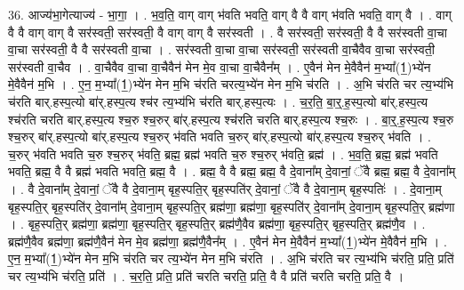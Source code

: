 \documentclass[17pt]{extarticle}
\begin{document}
36. आज्य॑भा॒गेत्याज्य॑ - भा॒गा॒ । . भ॒व॒ति॒ वाग् वाग् भ॑वति भवति॒ वाग् वै वै वाग् भ॑वति भवति॒ वाग् वै । . वाग् वै वै वाग् वाग् वै सर॑स्वती॒ सर॑स्वती॒ वै वाग् वाग् वै सर॑स्वती । . वै सर॑स्वती॒ सर॑स्वती॒ वै वै सर॑स्वती वा॒चा वा॒चा सर॑स्वती॒ वै वै सर॑स्वती वा॒चा । . सर॑स्वती वा॒चा वा॒चा सर॑स्वती॒ सर॑स्वती वा॒चैवैव वा॒चा सर॑स्वती॒ सर॑स्वती वा॒चैव । . वा॒चैवैव वा॒चा वा॒चैवैन॑ मेन मे॒व वा॒चा वा॒चैवैन᳚म् । . ए॒वैन॑ मेन मे॒वैवैन॑ म॒भ्या᳚(1॒)भ्ये॑न मे॒वैवैन॑ म॒भि । . ए॒न॒ म॒भ्या᳚(1॒)भ्ये॑न मेन म॒भि च॑रति चरत्य॒भ्ये॑न मेन म॒भि च॑रति । . अ॒भि च॑रति चर त्य॒भ्य॑भि च॑रति बार्.हस्प॒त्यो बा॑र्.हस्प॒त्य श्च॑र त्य॒भ्य॑भि च॑रति बार्.हस्प॒त्यः । . च॒र॒ति॒ बा॒र्॒.ह॒स्प॒त्यो बा॑र्.हस्प॒त्य श्च॑रति चरति बार्.हस्प॒त्य श्च॒रु श्च॒रुर् बा॑र्.हस्प॒त्य श्च॑रति चरति बार्.हस्प॒त्य श्च॒रुः । . बा॒र्॒.ह॒स्प॒त्य श्च॒रु श्च॒रुर् बा॑र्.हस्प॒त्यो बा॑र्.हस्प॒त्य श्च॒रुर् भ॑वति भवति च॒रुर् बा॑र्.हस्प॒त्यो बा॑र्.हस्प॒त्य श्च॒रुर् भ॑वति । . च॒रुर् भ॑वति भवति च॒रु श्च॒रुर् भ॑वति॒ ब्रह्म॒ ब्रह्म॑ भवति च॒रु श्च॒रुर् भ॑वति॒ ब्रह्म॑ । . भ॒व॒ति॒ ब्रह्म॒ ब्रह्म॑ भवति भवति॒ ब्रह्म॒ वै वै ब्रह्म॑ भवति भवति॒ ब्रह्म॒ वै । . ब्रह्म॒ वै वै ब्रह्म॒ ब्रह्म॒ वै दे॒वाना᳚म् दे॒वानां॒ ॅवै ब्रह्म॒ ब्रह्म॒ वै दे॒वाना᳚म् । . वै दे॒वाना᳚म् दे॒वानां॒ ॅवै वै दे॒वाना॒म् बृह॒स्पति॒र् बृह॒स्पति॑र् दे॒वानां॒ ॅवै वै दे॒वाना॒म् बृह॒स्पतिः॑ । . दे॒वाना॒म् बृह॒स्पति॒र् बृह॒स्पति॑र् दे॒वाना᳚म् दे॒वाना॒म् बृह॒स्पति॒र् ब्रह्म॑णा॒ ब्रह्म॑णा॒ बृह॒स्पति॑र् दे॒वाना᳚म् दे॒वाना॒म् बृह॒स्पति॒र् ब्रह्म॑णा । . बृह॒स्पति॒र् ब्रह्म॑णा॒ ब्रह्म॑णा॒ बृह॒स्पति॒र् बृह॒स्पति॒र् ब्रह्म॑णै॒वैव ब्रह्म॑णा॒ बृह॒स्पति॒र् बृह॒स्पति॒र् ब्रह्म॑णै॒व । . ब्रह्म॑णै॒वैव ब्रह्म॑णा॒ ब्रह्म॑णै॒वैन॑ मेन मे॒व ब्रह्म॑णा॒ ब्रह्म॑णै॒वैन᳚म् । . ए॒वैन॑ मेन मे॒वैवैन॑ म॒भ्या᳚(1॒)भ्ये॑न मे॒वैवैन॑ म॒भि । . ए॒न॒ म॒भ्या᳚(1॒)भ्ये॑न मेन म॒भि च॑रति चर त्य॒भ्ये॑न मेन म॒भि च॑रति । . अ॒भि च॑रति चर त्य॒भ्य॑भि च॑रति॒ प्रति॒ प्रति॑ चर त्य॒भ्य॑भि च॑रति॒ प्रति॑ । . च॒र॒ति॒ प्रति॒ प्रति॑ चरति चरति॒ प्रति॒ वै वै प्रति॑ चरति चरति॒ प्रति॒ वै । \newline
\pagebreak
{}
\end{document}
